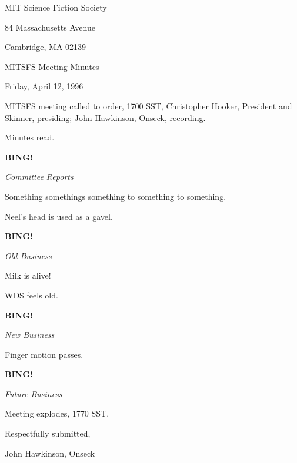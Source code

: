\documentclass[12pt]{article}
\newcommand{\bing}{{\bf BING!} }
\newcommand{\goto}[1]{\bing \vskip 12pt \centerline{{\em{#1}}}}
\begin{document}
\begin{center}

MIT Science Fiction Society 

84 Massachusetts Avenue

Cambridge, MA 02139

\vspace{12pt}

MITSFS Meeting Minutes 

Friday, April 12, 1996

\end{center}
 
\vspace{18pt}

\setlength{\parskip}{6pt}

\noindent
MITSFS meeting called to order, 1700 SST,
Christopher Hooker, President and Skinner, presiding; John Hawkinson, Onseck, recording.

Minutes read.

\goto{Committee Reports}

Something somethings something to something to something.

Neel's head is used as a gavel.

\goto{Old Business}

Milk is alive!

WDS feels old.

\goto{New Business}

Finger motion passes.

\goto{Future Business}

\vspace{12pt}

\noindent
Meeting explodes, 1770 SST.

\vspace{18pt}

\centerline{Respectfully submitted,}
\centerline{John Hawkinson, Onseck}
\end{document}
